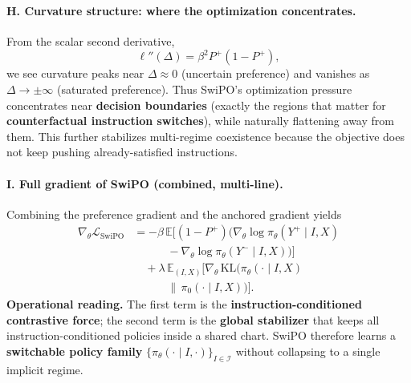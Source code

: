 \vspace{-0.35em}
\paragraph{\textbf{H. Curvature structure: where the optimization concentrates.}}
From the scalar second derivative,
\[
\ell''(\Delta)=\beta^2P^+(1-P^+),
\]
we see curvature peaks near $\Delta\approx 0$ (uncertain preference) and vanishes as $\Delta\to\pm\infty$ (saturated preference).
Thus SwiPO's optimization pressure concentrates near \textbf{decision boundaries} (exactly the regions that matter for \textbf{counterfactual instruction switches}), while naturally flattening away from them.
This further stabilizes multi-regime coexistence because the objective does not keep pushing already-satisfied instructions.

\vspace{-0.35em}
\paragraph{\textbf{I. Full gradient of SwiPO (combined, multi-line).}}
Combining the preference gradient and the anchored gradient yields
{\small
\begin{align*}
\nabla_\theta \mathcal{L}_{\mathrm{SwiPO}}
&= -\beta\,\mathbb{E}\Big[(1-P^+)\big(\nabla_\theta\log\pi_\theta(Y^+\mid I,X) \\
&\qquad\quad -\nabla_\theta\log\pi_\theta(Y^-\mid I,X)\big)\Big] \\
&\quad +\lambda\,\mathbb{E}_{(I,X)}\Big[\nabla_\theta\,\mathrm{KL}\big(\pi_\theta(\cdot\mid I,X)\\
&\qquad\quad \|\,\pi_0(\cdot\mid I,X)\big)\Big].
\end{align*}
}
\textbf{Operational reading.} The first term is the \textbf{instruction-conditioned contrastive force}; the second term is the \textbf{global stabilizer} that keeps all instruction-conditioned policies inside a shared chart.
SwiPO therefore learns a \textbf{switchable policy family} $\{\pi_\theta(\cdot\mid I,\cdot)\}_{I\in\mathcal{I}}$ without collapsing to a single implicit regime.

\vspace{-0.35em}
